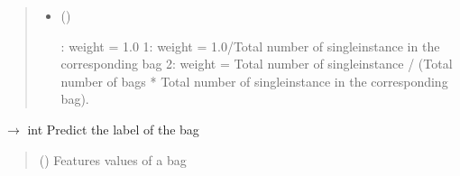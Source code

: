 \documentclass[letterpaper,10pt,english]{sphinxmanual}
\begin{document}
\begin{fulllineitems}
\begin{fulllineitems}
\begin{quote}
\begin{description}
\begin{itemize}
\item {} 
\sphinxAtStartPar
{} (\sphinxstyleliteralemphasis{\sphinxupquote{, }}) \textendash{} \begin{description}
: weight = 1.0
1: weight = 1.0/Total number of single\sphinxhyphen{}instance in the corresponding bag
2: weight = Total number of single\sphinxhyphen{}instance / (Total number of bags * Total number of single\sphinxhyphen{}instance in
the corresponding bag).

\end{description}


\end{itemize}

\end{description}\end{quote}

\end{fulllineitems}


\begin{fulllineitems}
\label{\detokenize{classifier/mi/_autosummary/miml.classifier.mi.mi_wrapper_classifier.MIWrapperClassifier:miml.classifier.mi.mi_wrapper_classifier.MIWrapperClassifier.predict}}
\pysigstartsignatures
\pysiglinewithargsret
{}
{}
{{ $\rightarrow$ int}}
\pysigstopsignatures
\sphinxAtStartPar
Predict the label of the bag
\begin{quote}\begin{description}
\sphinxAtStartPar
{} (\sphinxstyleliteralemphasis{\sphinxupquote{(}}\sphinxstyleliteralemphasis{\sphinxupquote{, }}\sphinxstyleliteralemphasis{\sphinxupquote{)}}) \textendash{} Features values of a bag


\end{description}
\end{quote}
\end{fulllineitems}
\end{fulllineitems}
\end{document}

